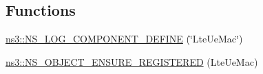 \subsection*{Functions}
\begin{DoxyCompactItemize}
\item 
\hyperlink{namespacens3_a148e1d3087a9a809694f9c495f0af4e0}{ns3\+::\+N\+S\+\_\+\+L\+O\+G\+\_\+\+C\+O\+M\+P\+O\+N\+E\+N\+T\+\_\+\+D\+E\+F\+I\+NE} (\char`\"{}Lte\+Ue\+Mac\char`\"{})
\item 
\hyperlink{namespacens3_ac90097ab538a01f00c7a7ba11c99e3bb}{ns3\+::\+N\+S\+\_\+\+O\+B\+J\+E\+C\+T\+\_\+\+E\+N\+S\+U\+R\+E\+\_\+\+R\+E\+G\+I\+S\+T\+E\+R\+ED} (Lte\+Ue\+Mac)
\end{DoxyCompactItemize}
